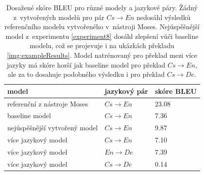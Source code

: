 \begin{table}[H]
    \begin{center}
        \begin{tabular}{lll}
          \toprule
           model & jazykový pár & skóre BLEU \\
          \midrule
           referenční z nástroje Moses & $Cs\rightarrow En$ & 23.08 \\
           baseline model & $Cs\rightarrow En$ & 7.36 \\
           nejúspěšnější vytvořený model & $Cs\rightarrow En$ & 9.87 \\
           více jazykový model & $Cs\rightarrow En$ & 7.10 \\
           více jazykový model & $En\rightarrow De$ & 7.39 \\
           více jazykový model & $Cs\rightarrow De$ & 0.14 \\
          \bottomrule
        \end{tabular}
    \end{center}
	\caption{Dosažené skóre BLEU pro různé modely a jazykové páry. Žádný z~vytvořených modelů pro pár $Cs\rightarrow En$ nedosáhl výsledků referenčního modelu vytvořeného v~nástroji Moses. Nejúspěšnější model z~experimentu \ref{experiment8} dosáhl zlepšení vůči baseline modelu, což se projevuje i na ukázkách překladu \ref{img:exampleResults}. Model natrénovaný pro překlad mezi více jazyky má skóre horší jak baseline model pro překlad $Cs\rightarrow En$, ale za to dosahuje podobného výsledku i pro překlad $Cs\rightarrow De$.}
	\label{table:results}
\end{table}


